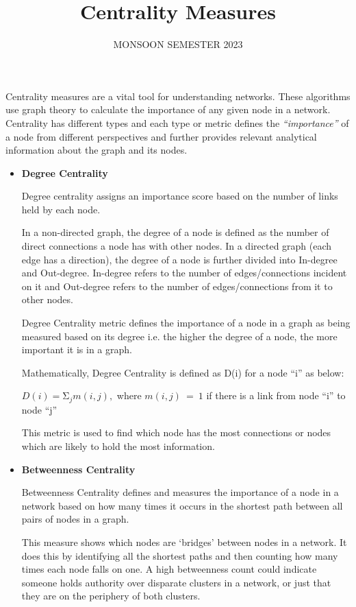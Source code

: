 \documentclass[12pt, a4paper]{report}
\title{Centrality Measures}
\date{MONSOON SEMESTER 2023}
\begin{document}
\maketitle

Centrality measures are a vital tool for understanding networks. These algorithms use graph theory to calculate the importance of any given node in a network. Centrality has different types and each type or metric defines the \emph{“importance”} of a node from different perspectives and further provides relevant analytical information about the graph and its nodes.
\begin{itemize}
    \item \textbf{Degree Centrality}
    
    Degree centrality assigns an importance score based on the number of links held by each node.
    
    In a non-directed graph, the degree of a node is defined as the number of direct connections a node has with other nodes. In a directed graph (each edge has a direction), the degree of a node is further divided into In-degree and Out-degree. In-degree refers to the number of edges/connections incident on it and Out-degree refers to the number of edges/connections from it to other nodes.
    
    Degree Centrality metric defines the importance of a node in a graph as being measured based on its degree i.e. the higher the degree of a node, the more important it is in a graph.
    
    Mathematically, Degree Centrality is defined as D(i) for a node “i” as below:

    $D\left(i\right)=\mathrm{\Sigma}_jm\left(i,j\right),$ where $m\left(i,j\right)\ =\ 1 $ if there is a link from node “i” to node “j”

    This metric is used to find which node has the most connections or nodes which are likely to hold the most information.
    \item \textbf{Betweenness Centrality}

    Betweenness Centrality defines and measures the importance of a node in a network based on how many times it occurs in the shortest path between all pairs of nodes in a graph.
    
    This measure shows which nodes are ‘bridges’ between nodes in a network. It does this by identifying all the shortest paths and then counting how many times each node falls on one. A high betweenness count could indicate someone holds authority over disparate clusters in a network, or just that they are on the periphery of both clusters.
    

\end{itemize}
\end{document}
